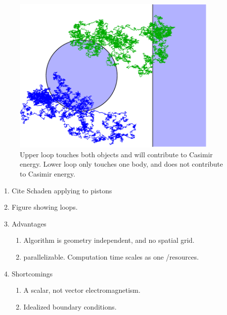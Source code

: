 \begin{figure}
\center
\includegraphics[width=10cm]{fig/intro/hit_strong_coupling}
\caption{Upper loop touches both objects and will contribute to Casimir energy.  Lower loop only touches one body, and does not contribute to Casimir energy.}
\end{figure}


\begin{enumerate}
\item Cite Schaden applying to pistons\cite{Schaden2009}
\item Figure showing loops.  
\item Advantages
  \begin{enumerate}
  \item Algorithm is geometry independent, and no spatial grid.
  \item parallelizable.  Computation time scales as one /resources.  
  \end{enumerate}

\item Shortcomings
\begin{enumerate}
  \item A scalar, not vector electromagnetism.
  \item Idealized boundary conditions.  
\end{enumerate}
  
\end{enumerate}


